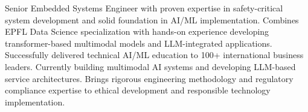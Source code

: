 %
%
%

\vspace*{-3mm}\par{
Senior Embedded Systems Engineer with proven expertise in safety-critical system development and solid foundation in AI/ML implementation. Combines EPFL Data Science specialization with hands-on experience developing transformer-based multimodal models and LLM-integrated applications. Successfully delivered technical AI/ML education to 100+ international business leaders. Currently building   multimodal AI systems and developing LLM-based service architectures. Brings rigorous engineering methodology and regulatory compliance expertise to ethical  development and responsible technology implementation.
}

